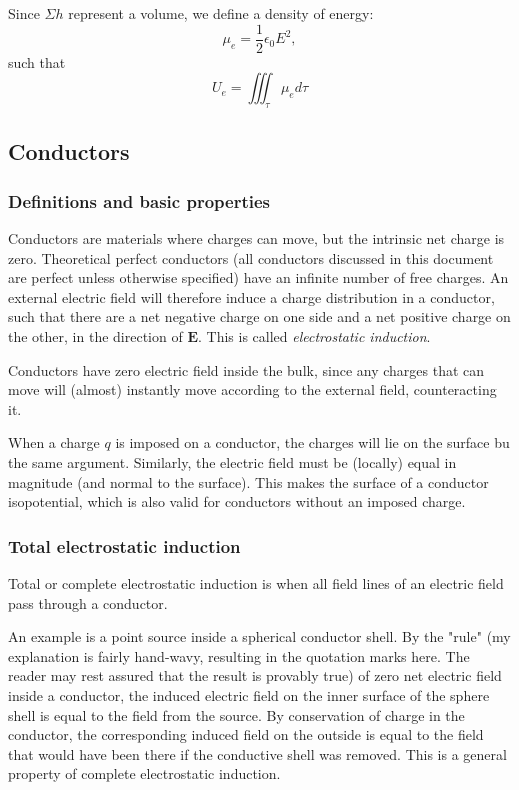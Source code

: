\documentclass[a4paper, 12pt]{article}
\renewcommand{\vec}[1]{\mathbf{#1}}
\newcommand{\E}{\ensuremath{\vec{E}}}
\newcommand{\e}{\ensuremath{\epsilon_0}}
\begin{document}
    Since $\Sigma h$ represent a volume, we define a density of energy: 
    \begin{equation}
        \mu_e = \frac{1}{2}\e E^2, 
    \end{equation}
    such that 
    \begin{equation}
        U_e = \iiint_\tau \mu_e d\tau
    \end{equation}
    
\subsection{Conductors}
    \subsubsection{Definitions and basic properties}
        Conductors are materials where charges can move, but the intrinsic net charge is zero. Theoretical perfect conductors (all conductors discussed in this document are perfect unless otherwise specified) have an infinite number of free charges. An external electric field will therefore induce a charge distribution in a conductor, such that there are a net negative charge on one side and a net positive charge on the other, in the direction of $\E$. This is called \textit{electrostatic induction}.
        
        Conductors have zero electric field inside the bulk, since any charges that can move will (almost) instantly move according to the external field, counteracting it. 
        
        When a charge $q$ is imposed on a conductor, the charges will lie on the surface bu the same argument. Similarly, the electric field must be (locally) equal in magnitude (and normal to the surface). This makes the surface of a conductor isopotential, which is also valid for conductors without an imposed charge. 
    \subsubsection{Total electrostatic induction}
        Total or complete electrostatic induction is when all field lines of an electric field pass through a conductor.
        
        An example is a point source inside a spherical conductor shell. By the "rule" (my explanation is fairly hand-wavy, resulting in the quotation marks here. The reader may rest assured that the result is provably true) of zero net electric field inside a conductor, the induced electric field on the inner surface of the sphere shell is equal to the field from the source. By conservation of charge in the conductor, the corresponding induced field on the outside is equal to the field that would have been there if the conductive shell was removed. This is a general property of complete electrostatic induction. 
  
\end{document}
